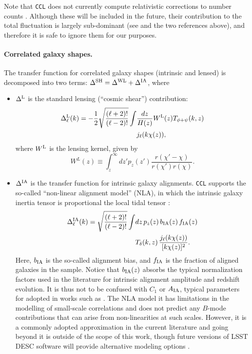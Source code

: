 \documentclass[\docopts]{\docclass}
\newcommand{\ccl}{{\tt CCL}\xspace}
\begin{document}
Note that \ccl does not currently compute relativistic corrections to number counts \citep{2011PhRvD..84d3516C,2011PhRvD..84f3505B}. Although these will be included in the future, their contribution to the total fluctuation is largely sub-dominant (see \citealt{GReffects} and the two references above), and therefore it is safe to ignore them for our purposes.

\paragraph{\bf Correlated galaxy shapes.} The transfer function for correlated galaxy shapes (intrinsic and lensed) is decomposed into two terms: $\Delta^{\rm SH}=\Delta^{\rm WL}+\Delta^{\rm IA}$, where
\begin{itemize}
  \item $\Delta^{\rm L}$ is the standard lensing (``cosmic shear'') contribution:
    \begin{align} \label{eq:transfer_lensing}
      \nonumber
      \Delta_\ell^{\rm L}(k)=-\frac{1}{2}\sqrt{\frac{(\ell+2)!}{(\ell-2)!}}\int &\frac{dz}{H(z)} W^{\rm L}(z)T_{\phi+\psi}(k,z)\\
      &j_\ell(k\chi(z)),
    \end{align}
    where $W^{\rm L}$ is the lensing kernel, given by
    \begin{equation}\label{eq:window_shear}
      W^L(z)\equiv\int_z^\infty dz' p_z(z')\frac{r(\chi'-\chi)}{r(\chi')r(\chi)}.
    \end{equation}
  \item $\Delta^{\rm IA}$ is the transfer function for intrinsic galaxy alignments. \ccl supports the so-called ``non-linear alignment model'' (NLA), in which the intrinsic galaxy inertia tensor is proportional the local tidal tensor \citep{Catelan01,2004PhRvD..70f3526H,2007MNRAS.381.1197H}:
    \begin{align}\nonumber
      \Delta_\ell^{\rm IA}(k)=\sqrt{\frac{(\ell+2)!}{(\ell-2)!}}\int &dz\,p_z(z)\,b_{\rm IA}(z)\,f_{\rm IA}(z)\\
      &T_\delta(k,z)\,\frac{j_\ell(k\chi(z))}{[k\chi(z)]^2}.
    \end{align}
    Here, $b_{\rm IA}$ is the so-called alignment bias, and $f_{\rm IA}$ is the fraction of aligned galaxies in the sample. Notice that $b_{\rm IA}(z)$ absorbs the typical normalization factors used in the literature for intrinsic alignment amplitude and redshift evolution. It is thus not to be confused with $C_1$ or $A_{\rm IA}$, typical parameters for adopted in works such as \citet{vanUitert18,Joudaki18,Hildebrandt17}. The NLA model  it has limitations in the modelling of small-scale correlations \citep{Singh15} and does not predict any $B$-mode contributions that can arise from non-linearities at such scales. However, it is a commonly adopted approximation in the current literature and going beyond it is outside of the scope of this work, though future versions of LSST DESC software will provide alternative modeling options \citep{Blazek17}.
    
\end{itemize}
\end{document}
